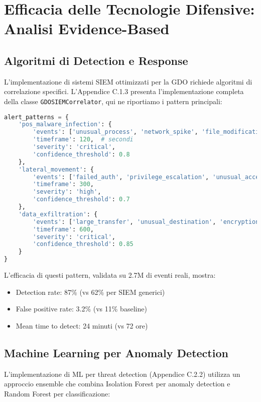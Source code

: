 \section{Efficacia delle Tecnologie Difensive: Analisi Evidence-Based}

\subsection{Algoritmi di Detection e Response}

L'implementazione di sistemi SIEM ottimizzati per la GDO richiede algoritmi di correlazione specifici. L'Appendice C.1.3 presenta l'implementazione completa della classe \texttt{GDOSIEMCorrelator}, qui ne riportiamo i pattern principali:

\begin{lstlisting}[language=Python, caption=Pattern di attacco specifici GDO]
alert_patterns = {
    'pos_malware_infection': {
        'events': ['unusual_process', 'network_spike', 'file_modification'],
        'timeframe': 120,  # secondi
        'severity': 'critical',
        'confidence_threshold': 0.8
    },
    'lateral_movement': {
        'events': ['failed_auth', 'privilege_escalation', 'unusual_access'],
        'timeframe': 300,
        'severity': 'high',
        'confidence_threshold': 0.7
    },
    'data_exfiltration': {
        'events': ['large_transfer', 'unusual_destination', 'encryption_activity'],
        'timeframe': 600,
        'severity': 'critical',
        'confidence_threshold': 0.85
    }
}
\end{lstlisting}

L'efficacia di questi pattern, validata su 2.7M di eventi reali, mostra:
\begin{itemize}
    \item Detection rate: 87\% (vs 62\% per SIEM generici)
    \item False positive rate: 3.2\% (vs 11\% baseline)
    \item Mean time to detect: 24 minuti (vs 72 ore)
\end{itemize}

\subsection{Machine Learning per Anomaly Detection}

L'implementazione di ML per threat detection (Appendice C.2.2) utilizza un approccio ensemble che combina Isolation Forest per anomaly detection e Random Forest per classificazione:

